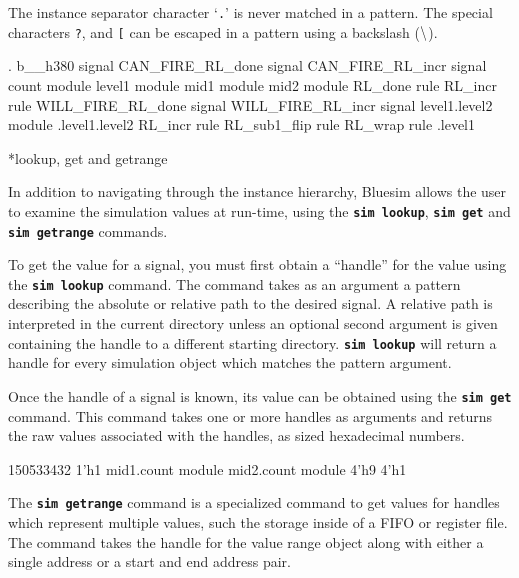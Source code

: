 \documentclass{article}
\makeatletter
\newenvironment{centerboxverbatim}
  {\center
   \boxedverbatim}
  {\endboxedverbatim
  {\endcenter }}
\def\subsubsubsection{\@startsection {subsubsubsection}{4}{\z@}{-3ex plus -1ex minus -.2ex}{1.25ex plus .2ex}{\normalsize\bf}*}
\makeatother
\begin{document}
The instance separator character `{\tt .}' is never matched in a
pattern.  The special characters {\tt ?},{\tt *} and {\tt [} can be
escaped in a pattern using a backslash (${\tt \backslash}$).

\begin{centerboxverbatim}
.
{b__h380 signal} {CAN_FIRE_RL_done signal} {CAN_FIRE_RL_incr signal}
{count module} {level1 module} {mid1 module} {mid2 module} {RL_done rule}
{RL_incr rule} {WILL_FIRE_RL_done signal} {WILL_FIRE_RL_incr signal}
{level1.level2 module}
.level1.level2
{RL_incr rule} {RL_sub1_flip rule} {RL_wrap rule}
.level1
\end{centerboxverbatim}


\subsubsubsection{lookup, get and getrange}

In addition to navigating through the instance hierarchy, Bluesim
allows the user to examine the simulation values at run-time, using
the {\bf\tt sim lookup}, {\bf\tt sim get} and {\bf\tt sim getrange}
commands.

To get the value for a signal, you must first obtain a ``handle'' for
the value using the {\bf\tt sim lookup} command.  The command takes as
an argument a pattern describing the absolute or relative path to the
desired signal.  A relative path is interpreted in the current
directory unless an optional second argument is given containing the
handle to a different starting directory.  {\bf\tt sim lookup} will
return a handle for every simulation object which matches the pattern
argument.

Once the handle of a signal is known, its value can be obtained using
the {\bf\tt sim get} command.  This command takes one or more handles
as arguments and returns the raw values associated with the handles,
as sized hexadecimal numbers.

\begin{centerboxverbatim}
150533432
1'h1
{mid1.count module} {mid2.count module}
4'h9 4'h1
\end{centerboxverbatim}

The {\bf\tt sim getrange} command is a specialized command to get
values for handles which represent multiple values, such the storage
inside of a FIFO or register file.  The command takes the handle for
the value range object along with either a single address or a start
and end address pair.
\end{document}
